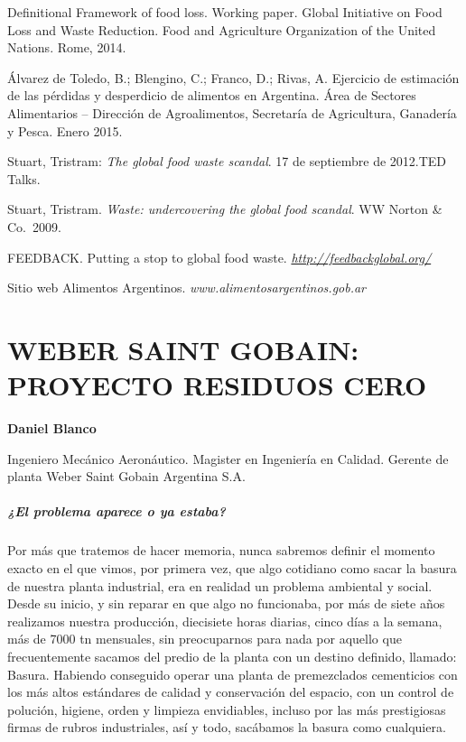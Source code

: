 \documentclass[
]{article}
\begin{document}
Definitional Framework of food loss. Working paper. Global Initiative on
Food Loss and Waste Reduction. Food and Agriculture Organization of the
United Nations. Rome, 2014.

Álvarez de Toledo, B.; Blengino, C.; Franco, D.; Rivas, A. Ejercicio de
estimación de las pérdidas y desperdicio de alimentos en Argentina. Área
de Sectores Alimentarios -- Dirección de Agroalimentos, Secretaría de
Agricultura, Ganadería y Pesca. Enero 2015.

Stuart, Tristram: \emph{The global food waste scandal}. 17 de septiembre
de 2012.TED Talks.

Stuart, Tristram. \emph{Waste: undercovering the global food scandal}.
WW Norton \& Co.~2009.

FEEDBACK. Putting a stop to global food waste.
\href{http://feedbackglobal.org/}{\emph{http://feedbackglobal.org/}}

Sitio web Alimentos Argentinos. \emph{www.alimentosargentinos.gob.ar}

\cleardoublepage

\hypertarget{weber-saint-gobain-proyecto-residuos-cero}{%
\section{WEBER SAINT GOBAIN: PROYECTO RESIDUOS
CERO}\label{weber-saint-gobain-proyecto-residuos-cero}}

\textbf{Daniel Blanco}

Ingeniero Mecánico Aeronáutico. Magister en Ingeniería en Calidad.
Gerente de planta Weber Saint Gobain Argentina S.A.

\hypertarget{el-problema-aparece-o-ya-estaba}{%
\subparagraph{¿El problema aparece o ya
estaba?}\label{el-problema-aparece-o-ya-estaba}}

Por más que tratemos de hacer memoria, nunca sabremos definir el momento
exacto en el que vimos, por primera vez, que algo cotidiano como sacar
la basura de nuestra planta industrial, era en realidad un problema
ambiental y social. Desde su inicio, y sin reparar en que algo no
funcionaba, por más de siete años realizamos nuestra producción,
diecisiete horas diarias, cinco días a la semana, más de 7000 tn
mensuales, sin preocuparnos para nada por aquello que frecuentemente
sacamos del predio de la planta con un destino definido, llamado:
Basura. Habiendo conseguido operar una planta de premezclados
cementicios con los más altos estándares de calidad y conservación del
espacio, con un control de polución, higiene, orden y limpieza
envidiables, incluso por las más prestigiosas firmas de rubros
industriales, así y todo, sacábamos la basura como cualquiera.
\end{document}

